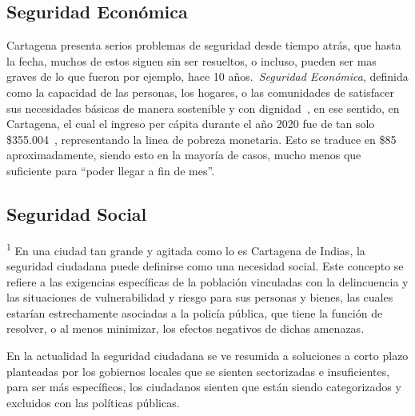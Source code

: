 \documentclass[letterpaper, 12pt]{article}
\newcommand{\cop}[1]{\$\SI{#1}{\COP}}
\newcommand{\dollar}[1]{\$\SI{#1}{\DOLLAR}}
\begin{document}


\subsection*{Seguridad Económica}

Cartagena presenta serios problemas de seguridad desde
tiempo atrás, que hasta la fecha, muchos de estos siguen
sin ser resueltos, o incluso, pueden ser mas graves de lo
que fueron por ejemplo, hace 10 años.~\textit{Seguridad
    Económica}, definida como la capacidad de las personas, los
hogares, o las comunidades de satisfacer sus necesidades
básicas de manera sostenible y con
dignidad~\cite{DeLaCruzRoja_2015}, en ese sentido, en
Cartagena, el cual el ingreso per cápita durante el año
2020 fue de tan solo \cop{355.004}~\cite{DANE_2021},
representando la linea de pobreza monetaria. Esto se
traduce en \dollar{85} aproximadamente, siendo esto en la
mayoría de casos, mucho menos que suficiente para ``poder
llegar a fin de mes''.


\subsection*{Seguridad Social}

\textsuperscript{1} En una ciudad tan grande y agitada como
lo es Cartagena de Indias, la seguridad ciudadana puede definirse como una
necesidad social. Este concepto se refiere a las exigencias
específicas de la población vinculadas con la delincuencia
y las situaciones de vulnerabilidad y riesgo para sus
personas y bienes, las cuales estarían estrechamente
asociadas a la policía pública, que tiene la función de
resolver, o al menos minimizar, los efectos negativos de
dichas amenazas.


En la actualidad la seguridad ciudadana se ve resumida a
soluciones a corto plazo planteadas por los gobiernos
locales que se sienten sectorizadas e insuficientes, para
ser más específicos, los ciudadanos sienten que están
siendo categorizados y excluidos con las políticas
públicas.
\end{document}
